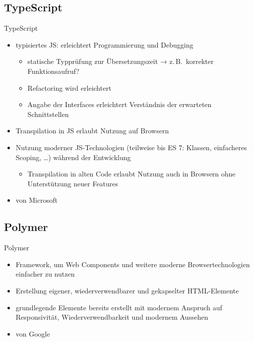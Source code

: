 \documentclass{beamer}
\newcommand{\zB}{z.\,B.\xspace}
\newcommand{\basedgfx}[1]{\raisebox{-.3\baselineskip}{\texttt{[image: \#1]}}}
\begin{document}
\subsection{TypeScript}
\begin{frame}{TypeScript}
	\begin{itemize}
		\item typisiertes \acl{JS}: erleichtert Programmierung und Debugging
			\begin{itemize}
				\item statische Typprüfung zur Übersetzungszeit → \zB\ korrekter Funktionsaufruf?
				\item Refactoring wird erleichtert
				\item Angabe der Interfaces erleichtert Verständnis der erwarteten Schnittstellen
			\end{itemize}
		\item Transpilation in \acl{JS} erlaubt Nutzung auf Browsern
		\item Nutzung moderner \ac{JS}-Technologien (teilweise bis \ac{ES} 7: Klassen, einfacheres Scoping, …) während der Entwicklung
			\begin{itemize}
				\item Transpilation in alten Code erlaubt Nutzung auch in Browsern ohne Unterstützung neuer Features
			\end{itemize}
		\item von Microsoft
	\end{itemize}
\end{frame}

\subsection{Polymer}
\begin{frame}{Polymer~\basedgfx{gfx/p-logo}}
	\begin{itemize}
		\item Framework, um Web Components und weitere moderne Browsertechnologien einfacher zu nutzen
		\item Erstellung eigener, wiederverwendbarer und gekapselter \acs{HTML}-Elemente
		\item grundlegende Elemente bereits erstellt mit modernem Anspruch auf Responsivität, Wiederverwendbarkeit und modernem Aussehen
		\item von Google
	\end{itemize}
\end{frame}
\end{document}
